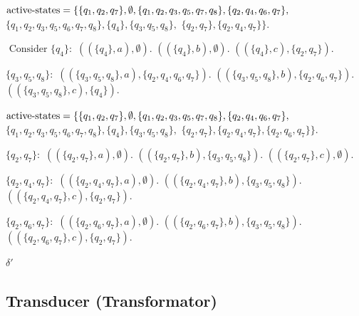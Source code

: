 \documentclass[hidelinks,12pt]{article}
\begin{document}
\begin{enumerate}
        $ \text{active-states} = \{\{q_1, q_2, q_7\}, \emptyset, \\ \{q_1, q_2, q_3, q_5, q_7, q_8\}, \{q_2, q_4, q_6, q_7\}, $
        $ \{q_1, q_2, q_3, q_5, q_6, q_7, q_8\}, \{q_4\}, \{q_3, q_5, q_8\}, $
        $ \{q_2, q_7\}, \{q_2, q_4, q_7\}\}.$

        $ \text{ Consider } \{q_4\}: $
        $ ((\{q_4\}, a), \emptyset). $
        $ ((\{q_4\}, b), \emptyset). $
        $ ((\{q_4\}, c), \{q_2, q_7\}). $


         $ \{q_3, q_5, q_8\}:$
        $ ((\{q_3, q_5, q_8\}, a), \{q_2, q_4, q_6, q_7\}). $
        $ ((\{q_3, q_5, q_8\}, b), \{q_2, q_6, q_7\}). $
        $ ((\{q_3, q_5, q_8\}, c), \{q_4\}). $

        $ \text{active-states} = \{\{q_1, q_2, q_7\}, \emptyset, \\ \{q_1, q_2, q_3, q_5, q_7, q_8\}, \{q_2, q_4, q_6, q_7\},\\ $
        $ \{q_1, q_2, q_3, q_5, q_6, q_7, q_8\}, \{q_4\}, \{q_3, q_5, q_8\}, $
        $ \{q_2, q_7\}, \{q_2, q_4, q_7\}, \{q_2, q_6, q_7\}\}.$ 

         $ \{q_2, q_7\}: $
        $ ((\{q_2, q_7\}, a), \emptyset). $
        $ ((\{q_2, q_7\}, b), \{q_3, q_5, q_8\}). $
        $ ((\{q_2, q_7\}, c), \emptyset). $


         $\{q_2, q_4, q_7\}:$
        $ ((\{q_2, q_4, q_7\}, a), \emptyset). $
        $ ((\{q_2, q_4, q_7\}, b), \{q_3, q_5, q_8\}). $
        $ ((\{q_2, q_4, q_7\}, c), \{q_2, q_7\}). $


         $\{q_2, q_6, q_7\}:$
        $ ((\{q_2, q_6, q_7\}, a), \emptyset). $
        $ ((\{q_2, q_6, q_7\}, b), \{q_3, q_5, q_8\}). $
        $ ((\{q_2, q_6, q_7\}, c), \{q_2, q_7\}). $

         $\delta'$ 
\end{enumerate}

\subsection{Transducer (Transformator)}
\end{document}
